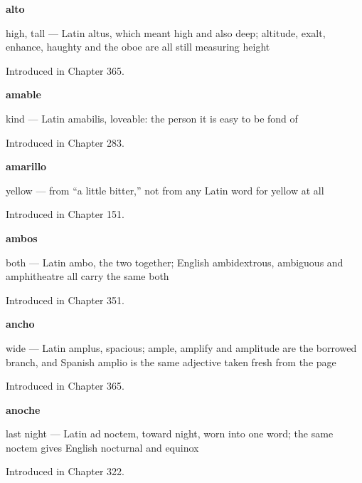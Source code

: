 \noindent\begin{minipage}[t]{\linewidth}
\raggedright
\textbf{alto}\par
\small high, tall — Latin altus, which meant high and also deep; altitude, exalt, enhance, haughty and the oboe are all still measuring height\par
\footnotesize Introduced in Chapter 365.
\end{minipage}\par\medskip

\noindent\begin{minipage}[t]{\linewidth}
\raggedright
\textbf{amable}\par
\small kind — Latin amabilis, loveable: the person it is easy to be fond of\par
\footnotesize Introduced in Chapter 283.
\end{minipage}\par\medskip

\noindent\begin{minipage}[t]{\linewidth}
\raggedright
\textbf{amarillo}\par
\small yellow — from \textquotedblleft{}a little bitter,\textquotedblright{} not from any Latin word for yellow at all\par
\footnotesize Introduced in Chapter 151.
\end{minipage}\par\medskip

\noindent\begin{minipage}[t]{\linewidth}
\raggedright
\textbf{ambos}\par
\small both — Latin ambo, the two together; English ambidextrous, ambiguous and amphitheatre all carry the same both\par
\footnotesize Introduced in Chapter 351.
\end{minipage}\par\medskip

\noindent\begin{minipage}[t]{\linewidth}
\raggedright
\textbf{ancho}\par
\small wide — Latin amplus, spacious; ample, amplify and amplitude are the borrowed branch, and Spanish amplio is the same adjective taken fresh from the page\par
\footnotesize Introduced in Chapter 365.
\end{minipage}\par\medskip

\noindent\begin{minipage}[t]{\linewidth}
\raggedright
\textbf{anoche}\par
\small last night — Latin ad noctem, toward night, worn into one word; the same noctem gives English nocturnal and equinox\par
\footnotesize Introduced in Chapter 322.
\end{minipage}\par\medskip

